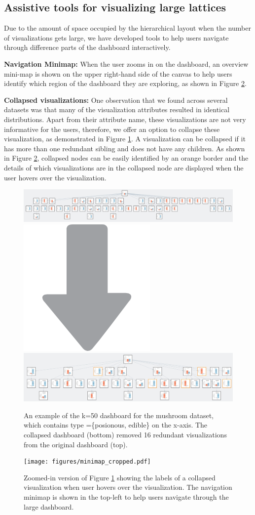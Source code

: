 \subsection{Assistive tools for visualizing large lattices}
Due to the amount of space occupied by the hierarchical layout when the number of visualizations gets large, we have developed tools to help users navigate through difference parts of the dashboard interactively. 
\par \textbf{Navigation Minimap:}  When the user zooms in on the dashboard, an overview mini-map is shown on the upper right-hand side of the canvas to help users identify which region of the dashboard they are exploring, as shown in Figure \ref{fig:hover_minimap}. 
\par \textbf{Collapsed visualizations:} 
One observation that we found across several datasets was that many of the visualization attributes resulted in identical distributions. Apart from their attribute name, these visualizations are not very informative for the users, therefore, we offer an option to collapse these visualization, as demonstrated in Figure \ref{fig:collapse_demo}. A visualization can be collapsed if it has more than one redundant sibling and does not have any children. As shown in Figure \ref{fig:hover_minimap}, collapsed nodes can be easily identified by an orange border and the details of which visualizations are in the collapsed node are displayed when the user hovers over the visualization.
\begin{figure}[ht!]
\centering
\includegraphics[width=\linewidth]{figures/k50_original.jpeg}
\includegraphics[width=0.05\linewidth]{figures/arrow_down.png}
\includegraphics[width=\linewidth]{figures/k50_collapsed.jpeg}
\caption{An example of the k=50 dashboard for the mushroom dataset\cite{mushroom}, which contains type =\{posionous, edible\} on the x-axis. The collapsed dashboard (bottom) removed 16 redundant visualizations from the original dashboard (top).}
\label{fig:collapse_demo}
\end{figure}
\begin{figure}[ht!]
\centering
\texttt{[image: figures/minimap\_cropped.pdf]}
\caption{Zoomed-in version of Figure \ref{fig:collapse_demo} showing the labels of a collapsed visualization when user hovers over the visualization. The navigation minimap is shown in the top-left to help users navigate through the large dashboard.}
\label{fig:hover_minimap}
\end{figure}
